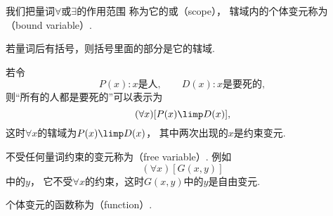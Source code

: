 我们把量词\(\forall\)或\(\exists\)的作用范围
称为它的或（scope），
辖域内的个体变元称为（bound variable）.

若量词后有括号，则括号里面的部分是它的辖域.

若令\[
	P(x):
	\text{$x$是人},
	\qquad
	D(x):
	\text{$x$是要死的},
\]
则“所有的人都是要死的”可以表示为\[
	(\forall x)[P(x) \limp D(x)],
\]
这时\(\forall x\)的辖域为\(P(x) \limp D(x)\)，
其中两次出现的\(x\)是约束变元.

不受任何量词约束的变元称为（free variable）.
例如\[
	(\forall x)[G(x,y)]
\]中的\(y\)，
它不受\(\forall x\)的约束，这时\(G(x,y)\)中的\(y\)是自由变元.

个体变元的函数称为（function）.
